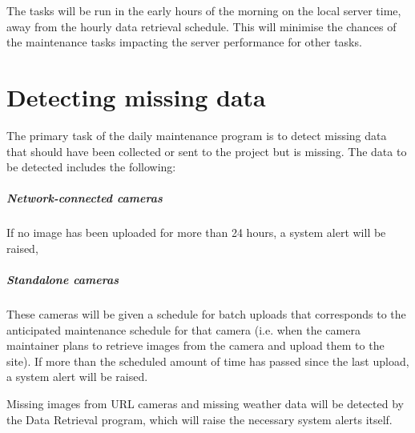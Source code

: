 \documentclass[11pt]{article}
\begin{document}
The tasks will be run in the early hours of the morning on the local server time, away from the hourly data retrieval schedule. This will minimise the chances of the maintenance tasks impacting the server performance for other tasks. 

\section{Detecting missing data}
The primary task of the daily maintenance program is to detect missing data that should have been collected or sent to the project but is missing. The data to be detected includes the following:

\subparagraph{Network-connected cameras} If no image has been uploaded for more than 24 hours, a system alert will be raised,

\subparagraph{Standalone cameras} These cameras will be given a schedule for batch uploads that corresponds to the anticipated maintenance schedule for that camera (i.e. when the camera maintainer plans to retrieve images from the camera and upload them to the site). If more than the scheduled amount of time has passed since the last upload, a system alert will be raised.

Missing images from URL cameras and missing weather data will be detected by the Data Retrieval program, which will raise the necessary system alerts itself.
\end{document}
